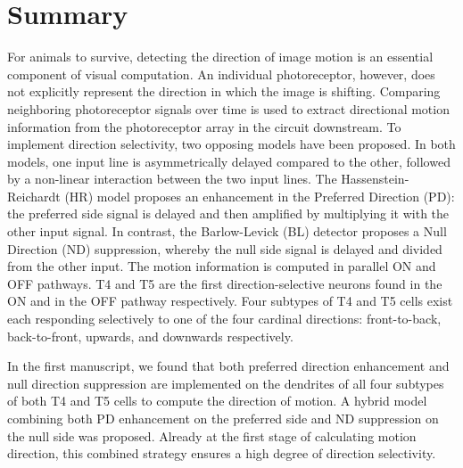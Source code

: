 
\begingroup
\let\clearpage\relax
\let\cleardoublepage\relax
\let\cleardoublepage\relax

\chapter*{Summary}

For animals to survive, detecting the direction of image motion is an essential component of visual computation. An individual photoreceptor, however, does not explicitly represent the direction in which the image is shifting. Comparing neighboring photoreceptor signals over time is used to extract directional motion information from the photoreceptor array in the circuit downstream. To implement direction selectivity, two opposing models have been proposed. In both models, one input line is asymmetrically delayed compared to the other, followed by a non-linear interaction between the two input lines. The Hassenstein-Reichardt (HR) model proposes an enhancement in the Preferred Direction (PD): the preferred side signal is delayed and then amplified by multiplying it with the other input signal. In contrast, the Barlow-Levick (BL) detector proposes a Null Direction (ND) suppression, whereby the null side signal is delayed and divided from the other input. The motion information is computed in parallel ON and OFF pathways. T4 and T5 are the first direction-selective neurons found in the ON and in the OFF pathway respectively. Four subtypes of T4 and T5 cells exist each responding selectively to one of the four cardinal directions: front-to-back, back-to-front, upwards, and downwards respectively.

In the first manuscript, we found that both preferred direction enhancement and null direction suppression are implemented on the dendrites of all four subtypes of both T4 and T5 cells to compute the direction of motion. A hybrid model combining both PD enhancement on the preferred side and ND suppression on the null side was proposed. Already at the first stage of calculating motion direction, this combined strategy ensures a high degree of direction selectivity. 

